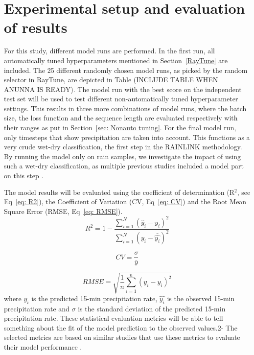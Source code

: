 \documentclass[twocolumn, 10pt, a4paper]{memoir}
\begin{document}
	\section{Experimental setup and evaluation of results} \label{sec: EvalStats}
	For this study, different model runs are performed. In the first run, all automatically tuned hyperparameters mentioned in Section~\ref{RayTune} are included. The 25 different randomly chosen model runs, as picked by the random selector in RayTune, are depicted in Table (INCLUDE TABLE WHEN ANUNNA IS READY). The model run with the best score on the independent test set will be used to test different non-automatically tuned hyperparameter settings. This results in three more combinations of model runs, where the batch size, the loss function and the sequence length are evaluated respectively with their ranges as put in Section~\ref{sec: Nonauto tuning}.
	For the final model run, only timesteps that show precipitation are taken into account. This functions as a very crude wet-dry classification, the first step in the RAINLINK methodology. By running the model only on rain samples, we investigate the impact of using such a wet-dry classification, as multiple previous studies included a model part on this step \cite{Habi2019}.

	The model results will be evaluated using the coefficient of determination (R$^{2}$, see Eq~\ref{eq: R2}), the Coefficient of Variation (CV, Eq~\ref{eq: CV}) and the Root Mean Square Error (RMSE, Eq~\ref{eq: RMSE}).
	\begin{equation} \label{eq: R2}
		R^2 = 1- \frac{\sum_{i=1}^{N} (\hat{y}_i - y_i)^2}{\sum_{i=1}^{N} (y_i - \bar{\hat{y_i}})^2}
	\end{equation}

	\begin{equation} \label{eq: CV}
		CV = \frac{\sigma}{\bar{y}}
	\end{equation}

	\begin{equation} \label{eq: RMSE}
		RMSE = \sqrt{\frac{1}{n} \sum_{i=1}^{n} (y_i - \hat{y_i})^2}
	\end{equation}
	where $y_i$ is the predicted 15-min precipitation rate, $\hat{y_i}$ is the observed 15-min precipitation rate and $\sigma$ is the standard deviation of the predicted 15-min precipitation rate.
	These statistical evaluation metrics will be able to tell something about the fit of the model prediction to the observed values.2- The selected metrics are based on similar studies that use these metrics to evaluate their model performance .
	
\end{document}
